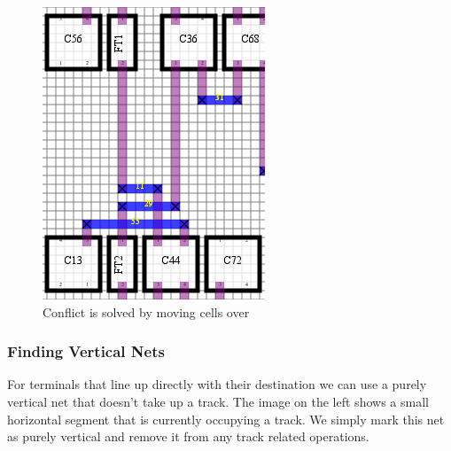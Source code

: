 \documentclass[10pt]{article}
\begin{document}
\begin{figure}[H]
\begin{minipage}{.5\textwidth}
                \includegraphics[width=0.75\linewidth]{./route_2_crop.png}
                \caption{Conflict is solved by moving cells over}
            \end{minipage}
        \end{figure}

    \subsubsection{Finding Vertical Nets}

        For terminals that line up directly with their destination we can use a
        purely vertical net that doesn't take up a track. The image on the left
        shows a small horizontal segment that is currently occupying a track.
        We simply mark this net as purely vertical and remove it from any track
        related operations.
\end{document}
